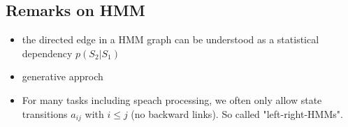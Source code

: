 \subsection*{Remarks on HMM}

\begin{itemize}
    \item the directed edge in a HMM graph can be understood as a statistical dependency $p(S_2|S_1)$
    \item generative approch
    \item For many tasks including speach processing, we often only allow state transitions $a_{ij}$ with $i \le j$ (no backward links). So called "left-right-HMMs".
\end{itemize}
